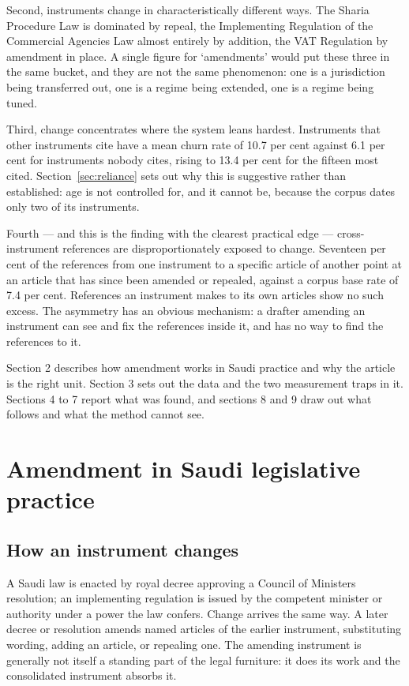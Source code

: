 \documentclass[11pt]{article}
\begin{document}
Second, instruments change in characteristically different ways. The Sharia
Procedure Law is dominated by repeal, the Implementing Regulation of the
Commercial Agencies Law almost entirely by addition, the VAT Regulation by
amendment in place. A single figure for `amendments' would put these three
in the same bucket, and they are not the same phenomenon: one is a
jurisdiction being transferred out, one is a regime being extended, one is a
regime being tuned.

Third, change concentrates where the system leans hardest. Instruments that
other instruments cite have a mean churn rate of 10.7 per cent against 6.1
per cent for instruments nobody cites, rising to 13.4 per cent for the fifteen
most cited. Section~\ref{sec:reliance} sets out why this is suggestive rather
than established: age is not controlled for, and it cannot be, because the
corpus dates only two of its instruments.

Fourth --- and this is the finding with the clearest practical edge ---
cross-instrument references are disproportionately exposed to change.
Seventeen per cent of the references from one instrument to a specific article
of another point at an article that has since been amended or repealed,
against a corpus base rate of 7.4 per cent. References an instrument makes to
its own articles show no such excess. The asymmetry has an obvious mechanism:
a drafter amending an instrument can see and fix the references inside it,
and has no way to find the references to it.

Section 2 describes how amendment works in Saudi practice and why the article
is the right unit. Section 3 sets out the data and the two measurement traps
in it. Sections 4 to 7 report what was found, and sections 8 and 9 draw out
what follows and what the method cannot see.

\section{Amendment in Saudi legislative practice}

\subsection{How an instrument changes}

A Saudi law is enacted by royal decree approving a Council of Ministers
resolution; an implementing regulation is issued by the competent minister or
authority under a power the law confers. Change arrives the same way. A later
decree or resolution amends named articles of the earlier instrument,
substituting wording, adding an article, or repealing one. The amending
instrument is generally not itself a standing part of the legal furniture: it
does its work and the consolidated instrument absorbs it.
\end{document}
